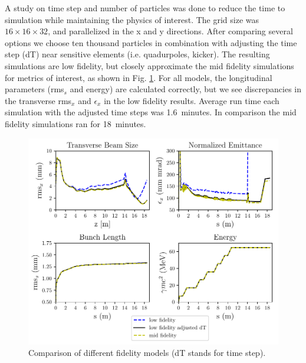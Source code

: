 A study on time step and 
number of particles was done to reduce the time to simulation while 
maintaining the physics of interest. 
The grid size was $16 \times 16 \times 32$, 
and parallelized in the x and y directions.
After comparing several options we choose ten thousand particles 
in combination with adjusting the time step (dT) near sensitive elements 
(i.e. quadurpoles, kicker). 
The resulting simulations are low fidelity, but closely approximate 
the mid fidelity simulations for metrics of interest, as shown in 
Fig. \ref{tstep}. For all models, the longitudinal parameters (rms$_s$ and energy) 
are calculated correctly, but we see discrepancies in the transverse 
rms$_x$ and $\epsilon_x$ in the low fidelity results. 
Average run time each simulation with the adjusted time steps was 1.6~minutes.
In comparison the mid fidelity simulations ran for 18~minutes.

\begin{figure}
	\centering
	\includegraphics[width=0.8\linewidth]{Report/timestep_comparison}
	\caption{Comparison of different fidelity models (dT stands for time step).}
	\label{tstep}
\end{figure}

